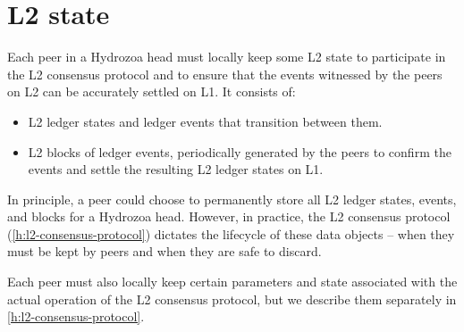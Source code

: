\documentclass[../hydrozoa.tex]{subfiles}
\begin{document}
\chapter{L2 state}%
\label{h:l2-state}

Each peer in a Hydrozoa head must locally keep some L2 state to participate in the L2 consensus protocol and to ensure that the events witnessed by the peers on L2 can be accurately settled on L1.
It consists of:
\begin{itemize}
  \item L2 ledger states and ledger events that transition between them.
  \item L2 blocks of ledger events, periodically generated by the peers to confirm the events and settle the resulting L2 ledger states on L1.
\end{itemize}

In principle, a peer could choose to permanently store all L2 ledger states, events, and blocks for a Hydrozoa head.
However, in practice, the L2 consensus protocol (\cref{h:l2-consensus-protocol}) dictates the lifecycle of these data objects -- when they must be kept by peers and when they are safe to discard.

Each peer must also locally keep certain parameters and state associated with the actual operation of the L2 consensus protocol, but we describe them separately in \cref{h:l2-consensus-protocol}.
\end{document}
